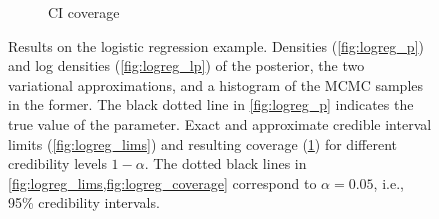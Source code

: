 \begin{figure}[ht]
\begin{subfigure}{\linewidth}
    \caption{CI coverage}
    \label{fig:logreg_coverage}
    \end{subfigure}
    \caption{Results on the logistic regression example.
    Densities (\cref{fig:logreg_p}) and log densities (\cref{fig:logreg_lp})
    of the posterior, the two variational approximations,
    and a histogram of the MCMC samples in the former.
    The black dotted line in \cref{fig:logreg_p}
    indicates the true value of the parameter.
    Exact and approximate credible interval limits (\cref{fig:logreg_lims})
    and resulting coverage (\cref{fig:logreg_coverage})
    for different credibility levels $1-\alpha$.
    The dotted black lines in \cref{fig:logreg_lims,fig:logreg_coverage}
    correspond to $\alpha=0.05$, i.e., 95\% credibility intervals.}
    \label{fig:logreg}
\end{figure}
